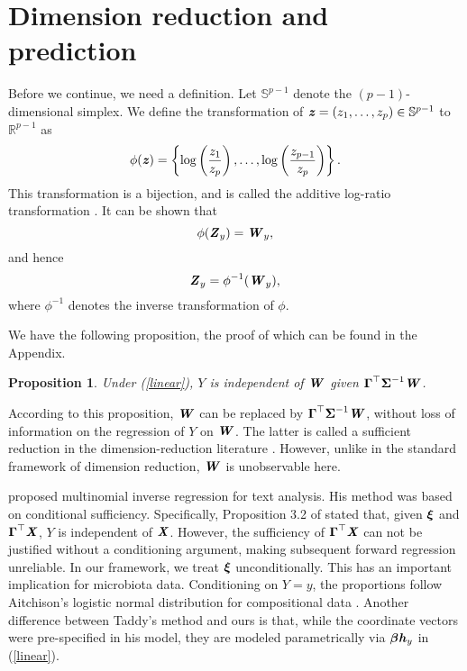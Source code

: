 \documentclass[12pt]{article}
\newtheorem{prop}{\sc Proposition}[section]
\def \bfith{\mbox{\textbf{\textit{h}}}}
\def \bfitz{\mbox{\textbf{\textit{z}}}}
\def \bfitW{\mbox{\textbf{\textit{W}}}}
\def \bfitX{\mbox{\textbf{\textit{X}}}}
\def \bfitZ{\mbox{\textbf{\textit{Z}}}}
\def \bfbeta{\mbox{\boldmath $\beta$}}
\def \bfxi{\mbox{\boldmath $\xi$}}
\def \bfGamma{\mbox{\boldmath $\Gamma$}}
\def \bfSigma{\mbox{\boldmath $\Sigma$}}
\begin{document}
\section{Dimension reduction and prediction}\label{sec_pred}

Before we continue, we need a definition. Let $\mathbb{S}^{p - 1}$ denote the $(p - 1)$-dimensional simplex. We define the transformation of $\bfitz = (z_1, \ldots, z_p) \in \mathbb{S}^{p - 1}$ to $\mathbb{R}^{p - 1}$ as
\begin{equation*}
\phi(\bfitz) = \left\{\log\left(\frac{z_{1}}{z_{p}}\right), \ldots, \log\left(\frac{z_{p-1}}{z_{p}}\right)\right\}.
\end{equation*}
This transformation is a bijection, and is called the additive log-ratio transformation \citep{aitchison1986statistical}. It can be shown that
\begin{equation}\label{alr}
\phi(\bfitZ_y) = \bfitW_y,
\end{equation}
and hence
\begin{equation}\label{alt}
\bfitZ_y = \phi^{-1}(\bfitW_y),
\end{equation}
where $\phi^{-1}$ denotes the inverse transformation of $\phi$.

We have the following proposition, the proof of which can be found in the Appendix. %
\begin{prop}\label{prop}
Under (\ref{linear}), $Y$ is independent of $\bfitW$ given $\bfGamma^{\top} \bfSigma^{-1} \bfitW$.
\end{prop}

According to this proposition, $\bfitW$ can be replaced by $\bfGamma^{\top} \bfSigma^{-1} \bfitW$, without loss of information on the regression of $Y$ on $\bfitW$. The latter is called a sufficient reduction in the dimension-reduction literature \citep{cook1998regression}. However, unlike in the standard framework of dimension reduction, $\bfitW$ is unobservable here.

\citet{taddy2010multinomial} proposed multinomial inverse regression for text analysis. His method was based on conditional sufficiency. Specifically, Proposition 3.2 of \citet{taddy2010multinomial} stated that, given $\bfxi$ and $\bfGamma^{\top} \bfitX$, $Y$ is independent of $\bfitX$. However, the sufficiency of $\bfGamma^{\top} \bfitX$ can not be justified without a conditioning argument, making subsequent forward regression unreliable. In our framework, we treat $\bfxi$ unconditionally. This has an important implication for microbiota data. Conditioning on $Y=y$, the proportions follow Aitchison's logistic normal distribution for compositional data \citep{aitchison1986statistical}. Another difference between Taddy's method and ours is that, while the coordinate vectors were pre-specified in his model, they are modeled parametrically via $\bfbeta \bfith_y$ in (\ref{linear}). %
\end{document}
